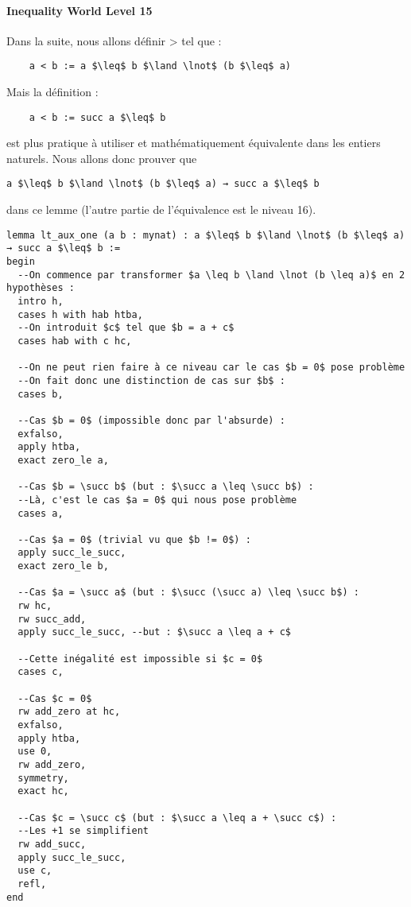 \paragraph{Inequality World Level 15}

Dans la suite, nous allons définir > tel que :
\begin{verbatim}
    a < b := a $\leq$ b $\land \lnot$ (b $\leq$ a)
\end{verbatim}
Mais la définition :
\begin{verbatim}
    a < b := succ a $\leq$ b
\end{verbatim}
est plus pratique à utiliser et mathématiquement équivalente dans les entiers naturels.
Nous allons donc prouver  que 
\begin{verbatim}
a $\leq$ b $\land \lnot$ (b $\leq$ a) → succ a $\leq$ b
\end{verbatim}
dans ce lemme (l'autre partie de l'équivalence est le niveau 16).

\begin{verbatim}
lemma lt_aux_one (a b : mynat) : a $\leq$ b $\land \lnot$ (b $\leq$ a) → succ a $\leq$ b :=
begin
  --On commence par transformer $a \leq b \land \lnot (b \leq a)$ en 2 hypothèses :
  intro h,
  cases h with hab htba,
  --On introduit $c$ tel que $b = a + c$
  cases hab with c hc,

  --On ne peut rien faire à ce niveau car le cas $b = 0$ pose problème
  --On fait donc une distinction de cas sur $b$ :
  cases b,

  --Cas $b = 0$ (impossible donc par l'absurde) :
  exfalso,
  apply htba,
  exact zero_le a,

  --Cas $b = \succ b$ (but : $\succ a \leq \succ b$) :
  --Là, c'est le cas $a = 0$ qui nous pose problème
  cases a,

  --Cas $a = 0$ (trivial vu que $b != 0$) :
  apply succ_le_succ,
  exact zero_le b,

  --Cas $a = \succ a$ (but : $\succ (\succ a) \leq \succ b$) :
  rw hc,
  rw succ_add,
  apply succ_le_succ, --but : $\succ a \leq a + c$
  
  --Cette inégalité est impossible si $c = 0$
  cases c,

  --Cas $c = 0$
  rw add_zero at hc,
  exfalso,
  apply htba,
  use 0,
  rw add_zero,
  symmetry,
  exact hc,

  --Cas $c = \succ c$ (but : $\succ a \leq a + \succ c$) :
  --Les +1 se simplifient
  rw add_succ,
  apply succ_le_succ,
  use c,
  refl,
end
\end{verbatim}
